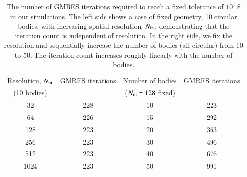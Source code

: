 \documentclass[preprint, 10pt]{elsarticle}
\begin{document}
\begin{table}%
\begin{center}
\caption{The number of GMRES iterations required to reach a fixed
tolerance of $10^{-}8$ in our simulations. The left side shows a case of fixed geometry, 10 circular bodies, with increasing spatial resolution, $N_{\mathrm{in}}$, demonstrating that the iteration count is independent of resolution. In the right side, we fix the resolution and sequentially increase the number of bodies (all circular) from 10 to 50. The iteration count increases roughly linearly with the number of bodies.
}
\vspace{0.3 pc}
\label{itertab}
\begin{tabular}{c c | c c}
\hline
\hspace{0.5pc} Resolution, $N_{\mathrm{in}}$
\hspace{0.5pc} & GMRES iterations 
\hspace{0.5pc} &  Number of bodies
\hspace{0.5pc} & GMRES iterations  \\
\hspace{0.0pc} (10 bodies) &
\hspace{0.5pc} & ($N_{\mathrm{in}} = 128$ fixed) & \\
\hline
%
32	& 228	& 10 	& 223	\\
64    	& 226	& 15 	& 292	\\
128	& 223	& 20 	& 363	\\
256	& 223	& 30 	& 496	\\
512	& 223	& 40 	& 676	\\
1024	& 223	& 50 	& 991	\\
%
\hline
\end{tabular}
\end{center}
\end{table}
\end{document}
